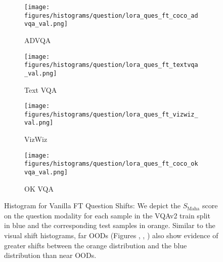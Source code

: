 \begin{figure*}[!h]
    \begin{subfigure}[b]{0.3\linewidth}
        \centering
        \texttt{[image: figures/histograms/question/lora\_ques\_ft\_coco\_advqa\_val.png]}
        \caption{ADVQA}
        \label{fig:vqadvqa}
    \end{subfigure}
    \hfill
    \begin{subfigure}[b]{0.3\linewidth}
        \centering
        \texttt{[image: figures/histograms/question/lora\_ques\_ft\_textvqa\_val.png]}
        \caption{Text VQA}
        \label{fig:vqtextvqa}
    \end{subfigure}
    \hfill
    \begin{subfigure}[b]{0.3\linewidth}
        \centering
        \texttt{[image: figures/histograms/question/lora\_ques\_ft\_vizwiz\_val.png]}
        \caption{VizWiz}
        \label{fig:vqvizwiz}
    \end{subfigure}

    \vspace{0.5cm} %

    \begin{subfigure}[b]{0.3\linewidth}
        \centering
        \texttt{[image: figures/histograms/question/lora\_ques\_ft\_coco\_okvqa\_val.png]}
        \caption{OK VQA}
        \label{fig:vqokvqa}
    \end{subfigure}

    \caption{Histogram for Vanilla FT Question Shifts: We depict the \( S_{\text{Maha}} \) score on the question modality for each sample in the VQAv2 train split in blue and the corresponding test samples in orange. Similar to the visual shift histograms, far OODs (Figures , , ) also show evidence of greater shifts between the orange distribution and the blue distribution than near OODs.}
    \label{fig:vq_histograms}
\end{figure*}


